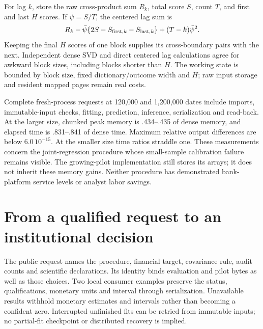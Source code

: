 For lag $k$, store the raw cross-product sum $R_k$, total score $S$, count $T$,
and first and last $H$ scores. If $\bar\psi=S/T$, the centered lag sum is
\[
 R_k-\bar\psi\{2S-S_{{\rm first},k}-S_{{\rm last},k}\}
       +(T-k)\bar\psi^2.
\]
Keeping the final $H$ scores of one block supplies its cross-boundary pairs
with the next. Independent dense SVD and direct centered lag calculations
agree for awkward block sizes, including blocks shorter than $H$. The
working state is bounded by block size, fixed dictionary/outcome width and
$H$; raw input storage and resident mapped pages remain real costs.

Complete fresh-process requests at 120,000 and 1,200,000 dates include imports,
immutable-input checks, fitting, prediction, inference, serialization and
read-back. At the larger size, chunked peak memory is .434--.435 of dense
memory, and elapsed time is .831--.841 of dense time. Maximum relative
output differences are below $6.0\,10^{-15}$. At the smaller size time ratios
straddle one. These measurements concern the joint-regression procedure whose
small-sample calibration failure remains visible. The growing-pilot
implementation still stores its arrays; it does not inherit these memory gains.
Neither procedure has demonstrated bank-platform service levels or analyst
labor savings.

\section{From a qualified request to an institutional decision}
\label{v9:external}

The public request names the procedure, financial target, covariance rule,
audit counts and scientific declarations. Its identity binds evaluation and
pilot bytes as well as those choices. Two local consumer examples preserve
the status, qualifications, monetary units and interval through serialization.
Unavailable results withhold monetary estimates and intervals rather than
becoming a confident zero. Interrupted unfinished fits can be retried from
immutable inputs; no partial-fit checkpoint or distributed recovery is implied.

